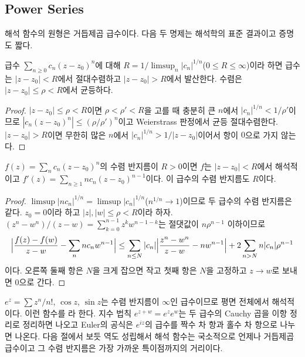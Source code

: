 \subsection{Power Series}

해석 함수의 원형은 거듭제곱 급수이다. 다음 두 명제는 해석학의 표준 결과이고 증명도 짧다.

\begin{proposition}
\label{prop:radius}
급수 $\sum_{n\ge0}c_n(z-z_0)^n$에 대해 $R=1/\limsup_n|c_n|^{1/n}$($0\le R\le\infty$)이라 하면 급수는 $|z-z_0|<R$에서 절대수렴하고 $|z-z_0|>R$에서 발산한다. 수렴은 $|z-z_0|\le\rho<R$에서 균등하다.
\end{proposition}

\begin{proof}
$|z-z_0|\le\rho<R$이면 $\rho<\rho'<R$을 고를 때 충분히 큰 $n$에서 $|c_n|^{1/n}<1/\rho'$이므로 $|c_n(z-z_0)^n|\le(\rho/\rho')^n$이고 Weierstrass 판정에서 균등 절대수렴한다. $|z-z_0|>R$이면 무한히 많은 $n$에서 $|c_n|^{1/n}>1/|z-z_0|$이어서 항이 $0$으로 가지 않는다.
\end{proof}

\begin{proposition}
\label{prop:termwise}
$f(z)=\sum_nc_n(z-z_0)^n$의 수렴 반지름이 $R>0$이면 $f$는 $|z-z_0|<R$에서 해석적이고 $f'(z)=\sum_{n\ge1}nc_n(z-z_0)^{n-1}$이다. 이 급수의 수렴 반지름도 $R$이다.
\end{proposition}

\begin{proof}
$\limsup|nc_n|^{1/n}=\limsup|c_n|^{1/n}$($n^{1/n}\to1$)이므로 두 급수의 수렴 반지름은 같다. $z_0=0$이라 하고 $|z|,|w|\le\rho<R$이라 하자. $(z^n-w^n)/(z-w)=\sum_{k=0}^{n-1}z^kw^{n-1-k}$는 절댓값이 $n\rho^{n-1}$ 이하이므로
\[
\Bigl|\frac{f(z)-f(w)}{z-w}-\sum_n nc_nw^{n-1}\Bigr|\le\sum_{n\le N}|c_n|\Bigl|\frac{z^n-w^n}{z-w}-nw^{n-1}\Bigr|+2\sum_{n>N}n|c_n|\rho^{n-1}
\]
이다. 오른쪽 둘째 항은 $N$을 크게 잡으면 작고 첫째 항은 $N$을 고정하고 $z\to w$로 보내면 $0$으로 간다.
\end{proof}

$e^z=\sum z^n/n!$, $\cos z$, $\sin z$는 수렴 반지름이 $\infty$인 급수이므로 평면 전체에서 해석적이다. 이런 함수를 라 한다. 지수 법칙 $e^{z+w}=e^ze^w$는 두 급수의 Cauchy 곱을 이항 정리로 정리하면 나오고 Euler의 공식은 $e^{iz}$의 급수를 짝수 차 항과 홀수 차 항으로 나누면 나온다. 다음 절에서 보듯 역도 성립해서 해석 함수는 국소적으로 언제나 거듭제곱 급수이고 그 수렴 반지름은 가장 가까운 특이점까지의 거리이다.

